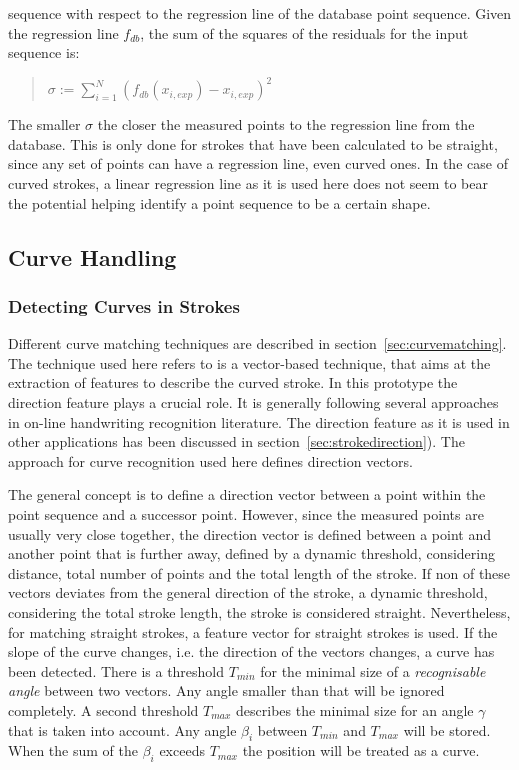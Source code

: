 sequence with respect to the regression line of the database point sequence.
Given the regression line \(f_{db}\), the sum of the squares of the residuals
for the input sequence is:
\begin{quote}
\(
    \sigma := \sum\limits_{i=1}^{N}{(f_{db}(x_{i,exp}) - x_{i,exp})^2}
\)
\end{quote}
The smaller \(\sigma\) the closer the measured points to the regression line
from the database. This is only done for strokes that have been calculated
to be straight, since any set of points can have a regression line,
even curved ones. In the case of curved strokes, a linear regression line as
it is used here does not seem to bear the potential helping identify a point 
sequence to be a certain shape.

\subsection{Curve Handling}
\label{sec:hwre:curvehandling}

\subsubsection{Detecting Curves in Strokes}
\label{sec:hwre:detectingcurvesinstrokes}

Different curve matching techniques are described in 
section~\ref{sec:curvematching}. The technique used here refers to is a 
vector-based technique, that aims at the extraction of features to describe
the curved stroke. In this prototype the direction feature plays a crucial role.
It is generally following several approaches in on-line handwriting recognition
literature. The direction feature as it is used in other applications has been
discussed in section~\ref{sec:strokedirection}). The approach for curve
recognition used here defines direction vectors.

The general concept is to define a direction vector between a point
within the point sequence and a successor point.
However, since the measured points are usually very close together, 
the direction vector is defined between a point and another point that 
is further away, defined by a dynamic threshold, considering distance,
total number of points and the total length of the stroke.
If non of these vectors deviates from the general direction of the stroke,
a dynamic threshold, considering the total stroke length,
the stroke is considered straight. Nevertheless, for matching straight strokes,
a feature vector for straight strokes is used.
If the slope of the curve changes, i.e. the direction of the vectors changes, 
a curve has been detected. 
There is a threshold \( T_{min} \) for the minimal size of a 
\emph{recognisable angle} between two vectors. Any angle smaller than that will 
be ignored completely. A second threshold \( T_{max} \) describes the minimal size
for an angle \( \gamma \)  that is taken into account.
Any angle \( \beta_{i} \) between \( T_{min} \) and \( T_{max} \) will be stored. 
When the sum of the \( \beta_{i} \) exceeds \( T_{max} \) the position will be 
treated as a curve.

